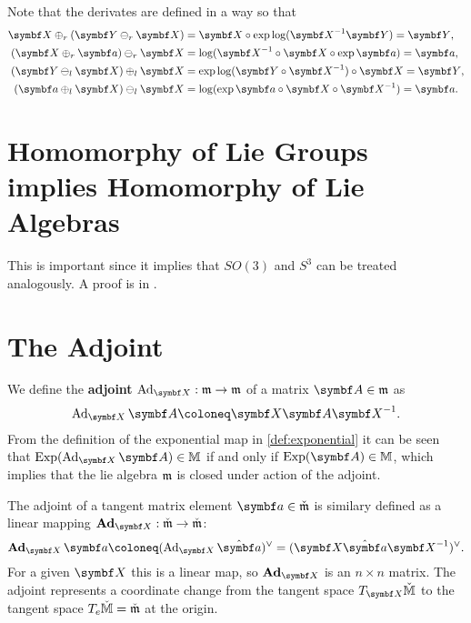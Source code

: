 Note that the derivates are defined in a way so that
\begin{subequations}
  \begin{align}
    \X \oplus_r (\Y \ominus_r \X ) & = \X \circ \exp \log (\X^{-1} \Y) = \Y,                                     \\
    (\X \oplus_r \a) \ominus_r \X  & = \log (\X^{-1} \circ \X \circ \exp \a) = \a,   \label{eq:x_plus_a_minus_x} \\
    (\Y \ominus_l \X ) \oplus_l \X & = \exp \log (\Y \circ \X^{-1}) \circ \X = \Y,                               \\
    (\a \oplus_l \X) \ominus_l \X  & = \log (\exp \a \circ \X \circ \X^{-1}) = \a.
  \end{align}
\end{subequations}


\section{Homomorphy of Lie Groups implies Homomorphy of Lie Algebras}

This is important since it implies that $SO(3)$ and $S^3$ can be treated analogously. A proof is in \cite[Corr. 20]{howe_very_1983}.

\section{The Adjoint}

We define the \textbf{adjoint} $\Ad_\X : \lM \rightarrow \lM$ of a matrix $\A \in \lM$ as
\begin{equation}
  \Ad_{\X} \A \coloneq \X \A \X^{-1}.
\end{equation}
From the definition of the exponential map in \eqref{def:exponential} it can be seen that $\Exp( \Ad_\X \A) \in \M$ if and only if $\Exp (\A) \in \M$, which implies that the lie algebra $\mathfrak{m}$ is closed under action of the adjoint.

The adjoint of a tangent matrix element $\a \in \clM$ is similary defined as a linear mapping $\bAd_\X : \clM \rightarrow \clM$:
\begin{equation}
  \label{eq:def_bad}
  \bAd_\X \a \coloneq (\Ad_{\X} \hat \a)^\vee = (\X \hat \a \X^{-1})^\vee.
\end{equation}
For a given $\X$ this is a linear map, so $\bAd_\X$ is an $n \times n$ matrix. The adjoint represents a coordinate change from the tangent space $T_\X \cM$ to the tangent space $T_e \check{\mathbb{M}} = \check{\mathfrak{m}}$ at the origin.

